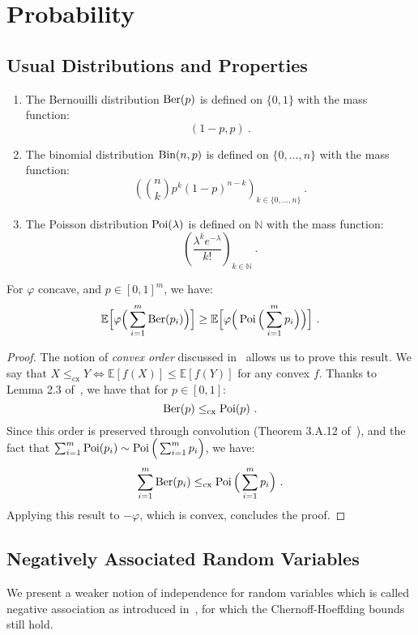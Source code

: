 \section{Probability}
\subsection{Usual Distributions and Properties}
\begin{definition}
  \begin{enumerate}
  \item The Bernouilli distribution $\operatorname{\text{Ber}}(p)$ is defined on $\{0,1\}$ with the mass function:
        \[ (1-p,p) \ . \]
  \item The binomial distribution $\operatorname{\text{Bin}}(n,p)$ is defined on $\{0,\ldots,n\}$ with the mass function:
        \[ \left(\binom{n}{k}p^k(1-p)^{n-k}\right)_{k \in \{0,\ldots,n\}} \ .\]
  \item The Poisson distribution $\operatorname{\text{Poi}}(\lambda)$ is defined on $\mathbb{N}$ with the mass function:
        \[ \left(\frac{\lambda^ke^{-\lambda}}{k!}\right)_{k \in \mathbb{N}} \ .\]
  \end{enumerate}      
\end{definition}

\begin{proposition}
    For $\varphi$ concave, and $p \in [0,1]^m$, we have:
    \[\mathbb{E}\Big[\varphi\Big(\sum_{i=1}^m\operatorname{\text{Ber}}(p_i)\Big)\Big] \geq \mathbb{E}\Big[\varphi\Big(\operatorname{\text{Poi}}\Big(\sum_{i=1}^m p_i\Big)\Big)\Big]\ .\]
  \label{prop:ConvexOrder}
\end{proposition}

\begin{proof}
  The notion of \emph{convex order} discussed in~\cite{SS07} allows us to prove this result. We say that $X \leq_{\text{cx}} Y \iff \mathbb{E}[f(X)] \leq \mathbb{E}[f(Y)]$ for any convex $f$. Thanks to Lemma 2.3 of~\cite{BFGG20}, we have that for $p \in [0,1]$:
  \[\Ber(p) \leq_{\text{cx}} \Poi(p)\ .\]
  Since this order is preserved through convolution (Theorem 3.A.12 of~\cite{SS07}), and the fact that $\sum_{i=1}^m \operatorname{\text{Poi}}(p_i) \sim \operatorname{\text{Poi}}\Big(\sum_{i=1}^m p_i\Big)$, we have:
  \[\sum_{i=1}^m\operatorname{\text{Ber}}(p_i) \leq_{\text{cx}}  \operatorname{\text{Poi}}\Big(\sum_{i=1}^m p_i\Big)\ .\]
  Applying this result to $-\varphi$, which is convex, concludes the proof.
\end{proof}

\subsection{Negatively Associated Random Variables}
We present a weaker notion of independence for random variables which is called negative association as introduced in~\cite{JP83}, for which the Chernoff-Hoeffding bounds still hold.

